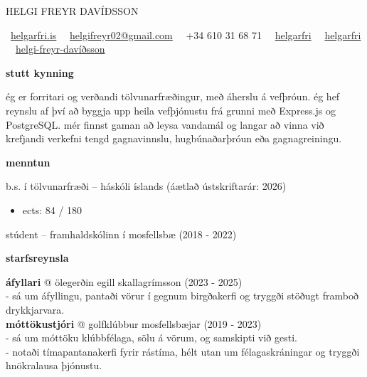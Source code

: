 \documentclass[11pt]{article}
\newcommand{\cvsection}[1]{\vspace{2em}\textbf{\large #1}\par\vspace{1em}}
\begin{document}
{\huge HELGI FREYR DAVÍÐSSON}\\
\medskip

\faGlobe\ \href{https://helgarfri.is}{helgarfri.is} \textbar\
\faEnvelope\ \href{mailto:helgifreyr02@gmail.com}{helgifreyr02@gmail.com} \textbar\
\faPhone\ +34 610 31 68 71 \textbar\
\faGithub\ \href{https://github.com/helgarfri}{helgarfri} \textbar\
\faInstagram\ \href{https://instagram.com/helgarfri}{helgarfri} \textbar\
\faLinkedin\ \href{https://www.linkedin.com/in/helgi-freyr-davíðsson-9841ba219}{helgi-freyr-davíðsson}


\cvsection{stutt kynning}
ég er forritari og verðandi tölvunarfræðingur, með áherslu á vefþróun.
ég hef reynslu af því að byggja upp heila vefþjónustu frá grunni með Express.js og PostgreSQL. mér finnst gaman að leysa vandamál og langar að vinna við krefjandi verkefni tengd gagnavinnslu, hugbúnaðarþróun eða gagnagreiningu.

\cvsection{menntun}
b.s. í tölvunarfræði -- háskóli íslands \hfill (áætlað ústskriftarár: 2026)

\begin{itemize}
  \item ects: 84 / 180
\end{itemize}

stúdent -- framhaldskólinn í mosfellsbæ \hfill (2018 - 2022)

\cvsection{starfsreynsla}
\textbf{áfyllari} @ ölegerðin egill skallagrímsson \hfill (2023 - 2025)\\
- sá um áfyllingu, pantaði vörur í gegnum birgðakerfi og tryggði stöðugt framboð drykkjarvara.\\

\textbf{móttökustjóri} @ golfklúbbur mosfellsbæjar \hfill (2019 - 2023)\\
- sá um móttöku klúbbfélaga, sölu á vörum, og samskipti við gesti. \\
- notaði tímapantanakerfi fyrir rástíma, hélt utan um félagaskráningar og tryggði hnökralausa þjónustu.
\end{document}

